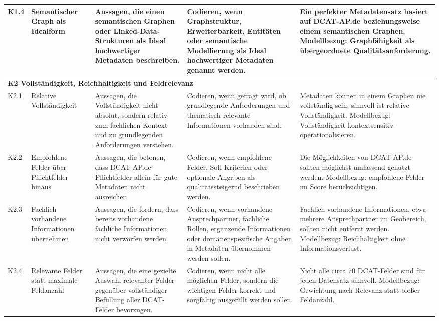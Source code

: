 \begin{longtable}{p{1cm} p{2.5cm} p{3.2cm} p{4.5cm} p{4.5cm}}
K1.4 & Semantischer Graph als Idealform
& Aussagen, die einen semantischen Graphen oder Linked-Data-Strukturen als Ideal hochwertiger Metadaten beschreiben.
& Codieren, wenn Graphstruktur, Erweiterbarkeit, Entitäten oder semantische Modellierung als Ideal hochwertiger Metadaten genannt werden.
& Ein perfekter Metadatensatz basiert auf DCAT-AP.de beziehungsweise einem semantischen Graphen. Modellbezug: Graphfähigkeit als übergeordnete Qualitätsanforderung. \\

\midrule
\multicolumn{5}{l}{\textbf{K2 Vollständigkeit, Reichhaltigkeit und Feldrelevanz}} \\
\midrule

K2.1 & Relative Vollständigkeit
& Aussagen, die Vollständigkeit nicht absolut, sondern relativ zum fachlichen Kontext und zu grundlegenden Anforderungen verstehen.
& Codieren, wenn gefragt wird, ob grundlegende Anforderungen und thematisch relevante Informationen vorhanden sind.
& Metadaten können in einem Graphen nie vollständig sein; sinnvoll ist relative Vollständigkeit. Modellbezug: Vollständigkeit kontextsensitiv operationalisieren. \\

K2.2 & Empfohlene Felder über Pflichtfelder hinaus
& Aussagen, die betonen, dass DCAT-AP.de-Pflichtfelder allein für gute Metadaten nicht ausreichen.
& Codieren, wenn empfohlene Felder, Soll-Kriterien oder optionale Angaben als qualitätssteigernd beschrieben werden.
& Die Möglichkeiten von DCAT-AP.de sollten möglichst umfassend genutzt werden. Modellbezug: empfohlene Felder im Score berücksichtigen. \\

K2.3 & Fachlich vorhandene Informationen übernehmen
& Aussagen, die fordern, dass bereits vorhandene fachliche Informationen nicht verworfen werden.
& Codieren, wenn vorhandene Ansprechpartner, fachliche Rollen, ergänzende Informationen oder domänenspezifische Angaben in Metadaten übernommen werden sollen.
& Fachlich vorhandene Informationen, etwa mehrere Ansprechpartner im Geobereich, sollten nicht entfernt werden. Modellbezug: Reichhaltigkeit ohne Informationsverlust. \\

K2.4 & Relevante Felder statt maximale Feldanzahl
& Aussagen, die eine gezielte Auswahl relevanter Felder gegenüber vollständiger Befüllung aller DCAT-Felder bevorzugen.
& Codieren, wenn nicht alle möglichen Felder, sondern die wichtigen Felder korrekt und sorgfältig ausgefüllt werden sollen.
& Nicht alle circa 70 DCAT-Felder sind für jeden Datensatz sinnvoll. Modellbezug: Gewichtung nach Relevanz statt bloßer Feldanzahl. \\


\end{longtable}
